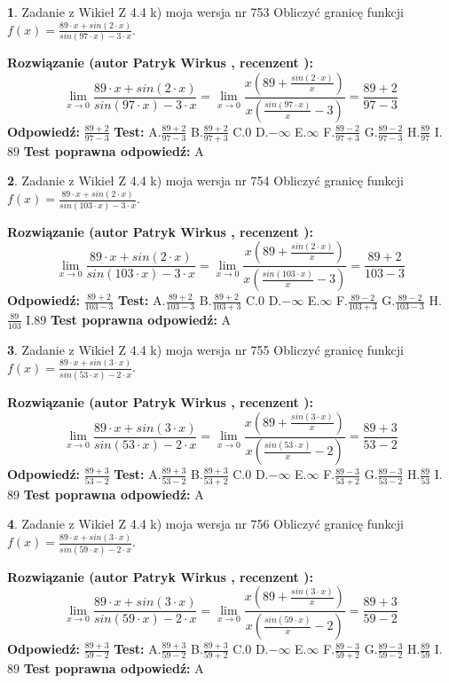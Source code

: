 \documentclass[12pt, a4paper]{article}
\theoremstyle{definition} %
\newtheorem{zad}{}
\newcommand{\zadStart}[1]{\begin{zad}#1\newline}
\newcommand{\zadStop}{\end{zad}}
\newcommand{\rozwStart}[2]{\noindent \textbf{Rozwiązanie (autor #1 , recenzent #2): }\newline}
\newcommand{\rozwStop}{\newline}
\newcommand{\odpStart}{\noindent \textbf{Odpowiedź:}\newline}
\newcommand{\odpStop}{\newline}
\newcommand{\testStart}{\noindent \textbf{Test:}\newline}
\newcommand{\testStop}{\newline}
\newcommand{\kluczStart}{\noindent \textbf{Test poprawna odpowiedź:}\newline}
\newcommand{\kluczStop}{\newline}
\begin{document}
\zadStart{Zadanie z Wikieł Z 4.4 k) moja wersja nr 753}
Obliczyć granicę funkcji $f(x)=\frac{89\cdot x +sin(2\cdot x)}{sin(97\cdot x) -3\cdot x}$.
\zadStop
\rozwStart{Patryk Wirkus}{}
$$\lim\limits_{x\to 0}\frac{89\cdot x +sin(2\cdot x)}{sin(97\cdot x) -3\cdot x}
=\lim\limits_{x\to 0}\frac{x(89+\frac{sin(2\cdot x)}{x})}{x(\frac{sin(97\cdot x)}{x}-3)}
=\frac{89+2}{97-3}$$
\rozwStop
\odpStart
$\frac{89+2}{97-3}$
\odpStop
\testStart
A.$\frac{89+2}{97-3}$
B.$\frac{89+2}{97+3}$
C.$0$
D.$-\infty$
E.$\infty$
F.$\frac{89-2}{97+3}$
G.$\frac{89-2}{97-3}$
H.$\frac{89}{97}$
I.$89$
\testStop
\kluczStart
A
\kluczStop



\zadStart{Zadanie z Wikieł Z 4.4 k) moja wersja nr 754}
Obliczyć granicę funkcji $f(x)=\frac{89\cdot x +sin(2\cdot x)}{sin(103\cdot x) -3\cdot x}$.
\zadStop
\rozwStart{Patryk Wirkus}{}
$$\lim\limits_{x\to 0}\frac{89\cdot x +sin(2\cdot x)}{sin(103\cdot x) -3\cdot x}
=\lim\limits_{x\to 0}\frac{x(89+\frac{sin(2\cdot x)}{x})}{x(\frac{sin(103\cdot x)}{x}-3)}
=\frac{89+2}{103-3}$$
\rozwStop
\odpStart
$\frac{89+2}{103-3}$
\odpStop
\testStart
A.$\frac{89+2}{103-3}$
B.$\frac{89+2}{103+3}$
C.$0$
D.$-\infty$
E.$\infty$
F.$\frac{89-2}{103+3}$
G.$\frac{89-2}{103-3}$
H.$\frac{89}{103}$
I.$89$
\testStop
\kluczStart
A
\kluczStop



\zadStart{Zadanie z Wikieł Z 4.4 k) moja wersja nr 755}
Obliczyć granicę funkcji $f(x)=\frac{89\cdot x +sin(3\cdot x)}{sin(53\cdot x) -2\cdot x}$.
\zadStop
\rozwStart{Patryk Wirkus}{}
$$\lim\limits_{x\to 0}\frac{89\cdot x +sin(3\cdot x)}{sin(53\cdot x) -2\cdot x}
=\lim\limits_{x\to 0}\frac{x(89+\frac{sin(3\cdot x)}{x})}{x(\frac{sin(53\cdot x)}{x}-2)}
=\frac{89+3}{53-2}$$
\rozwStop
\odpStart
$\frac{89+3}{53-2}$
\odpStop
\testStart
A.$\frac{89+3}{53-2}$
B.$\frac{89+3}{53+2}$
C.$0$
D.$-\infty$
E.$\infty$
F.$\frac{89-3}{53+2}$
G.$\frac{89-3}{53-2}$
H.$\frac{89}{53}$
I.$89$
\testStop
\kluczStart
A
\kluczStop



\zadStart{Zadanie z Wikieł Z 4.4 k) moja wersja nr 756}
Obliczyć granicę funkcji $f(x)=\frac{89\cdot x +sin(3\cdot x)}{sin(59\cdot x) -2\cdot x}$.
\zadStop
\rozwStart{Patryk Wirkus}{}
$$\lim\limits_{x\to 0}\frac{89\cdot x +sin(3\cdot x)}{sin(59\cdot x) -2\cdot x}
=\lim\limits_{x\to 0}\frac{x(89+\frac{sin(3\cdot x)}{x})}{x(\frac{sin(59\cdot x)}{x}-2)}
=\frac{89+3}{59-2}$$
\rozwStop
\odpStart
$\frac{89+3}{59-2}$
\odpStop
\testStart
A.$\frac{89+3}{59-2}$
B.$\frac{89+3}{59+2}$
C.$0$
D.$-\infty$
E.$\infty$
F.$\frac{89-3}{59+2}$
G.$\frac{89-3}{59-2}$
H.$\frac{89}{59}$
I.$89$
\testStop
\kluczStart
A
\kluczStop
\end{document}
